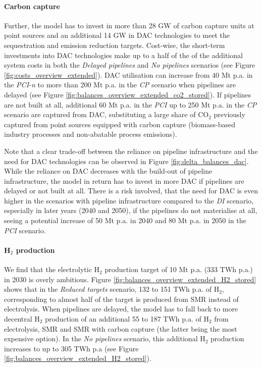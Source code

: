 \documentclass[pdflatex,sn-nature]{sn-jnl}%
\theoremstyle{thmstyleone}%
\theoremstyle{thmstyletwo}%
\theoremstyle{thmstylethree}%
\begin{document}
\paragraph{Carbon capture}
Further, the model has to invest in more than 28 GW of carbon capture units at point sources and an additional 14 GW in DAC technologies to meet the sequestration and emission reduction targets. Cost-wise, the short-term investments into DAC technologies make up to a half of the of the additional system costs in both the \textit{Delayed pipelines} and \textit{No pipelines} scenarios (see Figure \ref{fig:costs_overview_extended}). DAC utilisation can increase from 40 Mt p.a. in the \textit{PCI-n} to more than 200 Mt p.a. in the \textit{CP} scenario when pipelines are delayed (see Figure \ref{fig:balances_overview_extended_co2_stored}). If pipelines are not built at all, additional 60 Mt p.a. in the \textit{PCI} up to 250 Mt p.a. in the \textit{CP} scenario are captured from DAC, substituting a large share of CO$_2$ previously captured from point sources equipped with carbon capture (biomass-based industry processes and non-abatable process emissions).

Note that a clear trade-off between the reliance on pipeline infrastructure and the need for DAC technologies can be observed in Figure \ref{fig:delta_balances_dac}. While the reliance on DAC decreases with the build-out of pipeline infrastructure, the model in return has to invest in more DAC if pipelines are delayed or not built at all. There is a risk involved, that the need for DAC is even higher in the scenarios with pipeline infrastructure compared to the \textit{DI} scenario, especially in later years (2040 and 2050), if the pipelines do not materialise at all, seeing a potential increase of 50 Mt p.a. in 2040 and 80 Mt p.a. in 2050 in the \textit{PCI} scenario.
\paragraph{H$_2$ production} 
We find that the electrolytic H$_2$ production target of 10 Mt p.a. (333 TWh p.a.) in 2030 is overly ambitious. Figure \ref{fig:balances_overview_extended_H2_stored} shows that in the \textit{Reduced targets} scenario, 132 to 151 TWh p.a. of H$_2$, corresponding to almost half of the target is produced from SMR instead of electrolysis. When pipelines are delayed, the model has to fall back to more decentral H$_2$ production of an additional 55 to 187 TWh p.a. of H$_2$ from electrolysis, SMR and SMR with carbon capture (the latter being the most expensive option). In the \textit{No pipelines} scenario, this additional H$_2$ production increases to up to 305 TWh p.a (see Figure \ref{fig:balances_overview_extended_H2_stored}).
\end{document}
